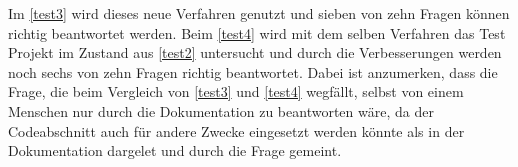 \documentclass[../main.tex]{subfiles}
\begin{document}
Im \ref{test3} wird dieses neue Verfahren genutzt und sieben von zehn Fragen können richtig beantwortet werden.
Beim \ref{test4} wird mit dem selben Verfahren das Test Projekt im Zustand aus \ref{test2} untersucht und durch die Verbesserungen werden noch sechs von zehn Fragen richtig beantwortet.
Dabei ist anzumerken, dass die Frage, die beim Vergleich von \ref{test3} und \ref{test4} wegfällt, selbst von einem Menschen nur durch die Dokumentation zu beantworten wäre, da der Codeabschnitt auch für andere Zwecke eingesetzt werden könnte als in der Dokumentation dargelet und durch die Frage gemeint.
\end{document}
